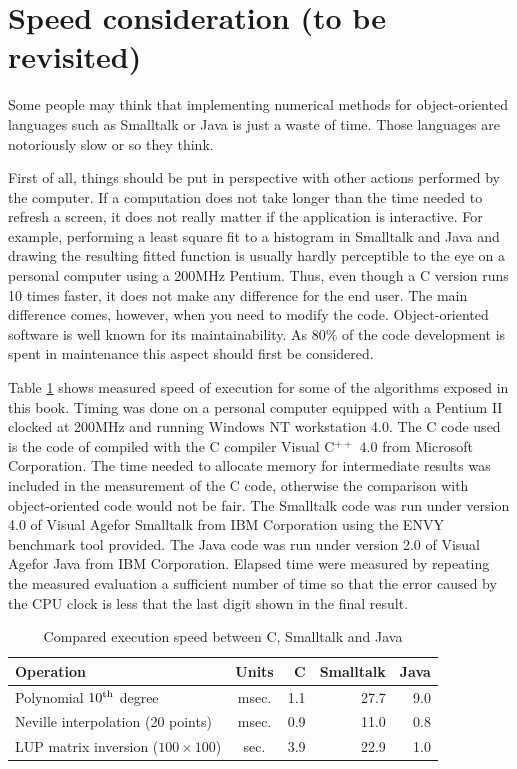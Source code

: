 \documentclass[twoside]{book}
\begin{document}
\section{Speed consideration (to be revisited)}
\label{sec:speed} Some people may think that implementing
numerical methods for object-oriented languages such as Smalltalk
or Java is just a waste of time. Those languages are notoriously
slow or so they think.

First of all, things should be put in perspective with other
actions performed by the computer. If a computation does not take
longer than the time needed to refresh a screen, it does not
really matter if the application is interactive. For example,
performing a least square fit to a histogram in Smalltalk and Java
and drawing the resulting fitted function is usually hardly
perceptible to the eye on a personal computer using a 200MHz
Pentium. Thus, even though a C version runs 10 times faster, it
does not make any difference for the end user. The main difference
comes, however, when you need to modify the code. Object-oriented
software is well known for its maintainability. As $80\%$ of the
code development is spent in maintenance this aspect should first
be considered.

Table \ref{tb:speed} shows measured speed of execution for some of
the algorithms exposed in this book. Timing was done on a personal
computer equipped with a Pentium II clocked at 200MHz and running
Windows NT workstation 4.0. The C code used is the code of
\cite{Press} compiled with the C compiler Visual C$^{++}$ 4.0 from
Microsoft Corporation. The time needed to allocate memory for
intermediate results was included in the measurement of the C
code, otherwise the comparison with object-oriented code would not
be fair. The Smalltalk code was run under version 4.0 of Visual
Age\tm for Smalltalk from IBM Corporation using the ENVY benchmark
tool provided. The Java code was run under version 2.0 of Visual
Age\tm for Java from IBM Corporation. Elapsed time were measured
by repeating the measured evaluation a sufficient number of time
so that the error caused by the CPU clock is less that the last
digit shown in the final result.
\begin{table}[h]
\caption{Compared execution speed between C, Smalltalk and Java}
\label{tb:speed} \vspace{1 ex}
\begin{tabular}{|l | c r r r|} \hline
  \hfil {\bf Operation} & {\bf Units} & {\bf C}\hfil & {\bf Smalltalk}\hfil & {\bf Java}\hfil \\ \hline
  Polynomial $10^{\mathop{\rm th}}$ degree & msec. & 1.1 & 27.7 & 9.0 \\
  Neville interpolation (20 points) & msec. & 0.9 & 11.0 & 0.8 \\
  LUP matrix inversion ($100\times 100$)& sec. & 3.9 & 22.9 & 1.0 \\ \hline
\end{tabular}
\end{table}
\end{document}
